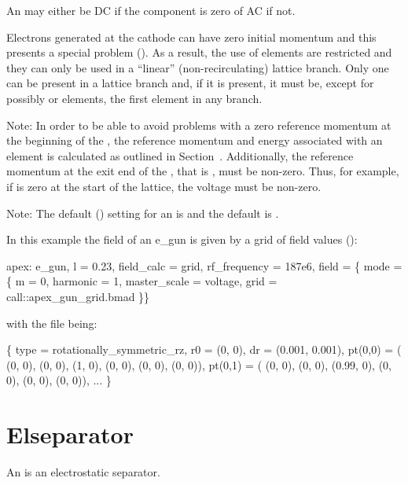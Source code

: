 An  may either be DC if the  component is
zero of AC if not.

Electrons generated at the cathode can have zero initial momentum and
this presents a special problem (). As a result, the
use of  elements are restricted and they can only be used in
a ``linear'' (non-recirculating) lattice branch. Only one 
can be present in a lattice branch and, if it is present, it must be,
except for possibly  or  elements, the first
element in any branch.
 
Note: In order to be able to avoid problems with a zero reference
momentum at the beginning of the , the reference momentum
and energy associated with an  element is calculated as
outlined in Section~. Additionally, the reference
momentum at the exit end of the , that is , must be
non-zero. Thus, for example, if  is zero at the start of the
lattice, the  voltage must be non-zero. 

Note: The default  () setting for an
 is  and the default
 is .

In this example the field of an e_gun is given by a grid of field
values ():
\begin{example}
  apex: e_gun, l = 0.23, field_calc = grid, rf_frequency = 187e6, 
    field = \{ mode = \{
      m = 0, harmonic = 1,
      master_scale = voltage,
      grid = call::apex_gun_grid.bmad \}\}
\end{example}
with the file  being:
\begin{example}
  \{
    type = rotationally_symmetric_rz,
    r0 = (0, 0),
    dr = (0.001, 0.001),
    pt(0,0) = ( (0, 0), (0, 0), (1, 0),  (0, 0), (0, 0), (0, 0)),
    pt(0,1) = ( (0, 0), (0, 0), (0.99, 0),  (0, 0), (0, 0), (0, 0)),
    ... \}
\end{example}

\section{Elseparator}
\label{s:elsep}

An  is an electrostatic separator.

